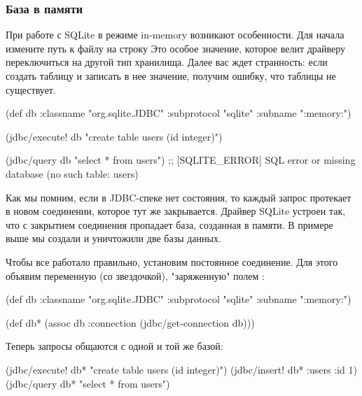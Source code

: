 \subsubsection{База в памяти}

При работе с SQLite в режиме in-memory возникают особенности. Для начала измените путь к файлу на строку  Это особое значение, которое велит драйверу переключиться на другой тип хранилища. Далее вас ждет странность: если создать таблицу и записать в нее значение, получим ошибку, что таблицы не существует.

\begin{english}
  \begin{clojure}
(def db
  {:classname   "org.sqlite.JDBC"
   :subprotocol "sqlite"
   :subname     ":memory:"})

(jdbc/execute! db "create table users (id integer)")

(jdbc/query db "select * from users")
;; [SQLITE_ERROR] SQL error or missing database (no such table: users)
  \end{clojure}
\end{english}

Как мы помним, если в JDBC-спеке нет состояния, то каждый запрос протекает в новом соединении, которое тут же закрывается. Драйвер SQLite устроен так, что с закрытием соединения пропадает база, созданная в памяти. В примере выше мы создали и уничтожили две базы данных.

Чтобы все работало правильно, установим постоянное соединение. Для этого объявим переменную  (со звездочкой), "заряженную" полем :

\begin{english}
  \begin{clojure}
(def db
  {:classname   "org.sqlite.JDBC"
   :subprotocol "sqlite"
   :subname     ":memory:"})

(def db*
  (assoc db :connection
         (jdbc/get-connection db)))
  \end{clojure}
\end{english}

Теперь запросы общаются с одной и той же базой:

\begin{english}
  \begin{clojure}
(jdbc/execute! db* "create table users (id integer)")
(jdbc/insert! db* :users {:id 1})
(jdbc/query db* "select * from users")
  \end{clojure}
\end{english}

